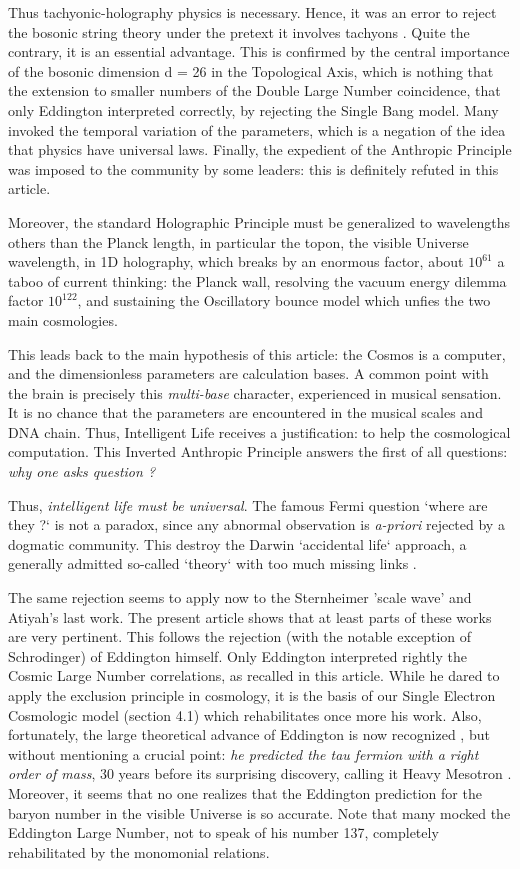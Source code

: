 \documentclass[twoside,draft]{article}
\begin{document}
\begin{sloppypar}
Thus tachyonic-holography physics is necessary. Hence, it was an error to reject the bosonic string theory under the pretext it involves tachyons \cite{Woigt}. Quite the contrary, it is an essential advantage. This is confirmed by the central importance of the bosonic dimension d = 26 in the Topological Axis, which is nothing that the extension to smaller numbers of the Double Large Number coincidence, that only Eddington interpreted correctly, by rejecting the Single Bang model. Many invoked the temporal variation of the parameters, which is a negation of the idea that physics have universal laws. Finally, the expedient of the Anthropic Principle was imposed to the community by some leaders: this is definitely refuted in this article.

Moreover, the standard Holographic Principle must be generalized to wavelengths others than the Planck
length, in particular the topon, the visible Universe wavelength, in 1D holography, which breaks by an enormous factor, about $10^{61}$ a taboo of current thinking: the Planck wall, resolving the vacuum energy dilemma factor $10^{122}$, and sustaining the Oscillatory bounce model which unfies the two main cosmologies.

This leads back to the main hypothesis of this article: the Cosmos is a computer, and the dimensionless parameters are calculation bases. A common point with the brain is precisely this \textit{multi-base} character, experienced in musical sensation. It is no chance that the parameters are encountered in the musical scales and DNA chain. Thus, Intelligent Life receives a justification: to help the cosmological computation. This Inverted Anthropic Principle answers the first of all questions: \textit{why one asks question ?} 

Thus, \textit{intelligent life must be universal}. The famous Fermi question `where are they ?` is not a paradox, since any abnormal observation is \textit{a-priori} rejected by a dogmatic community. This destroy the Darwin `accidental life` approach, a generally admitted so-called `theory` with too much missing links \cite{Chauvin}.

The same rejection seems to apply now to the Sternheimer 'scale wave' and Atiyah's last work. The present article shows that at least parts of these works are very pertinent. This follows the rejection (with the notable exception of Schrodinger) of Eddington\cite{Eddington} himself. Only Eddington interpreted rightly the Cosmic Large Number correlations, as recalled in this article. While he dared to apply the exclusion principle in cosmology, it is the basis of our Single Electron Cosmologic model (section 4.1) which rehabilitates once more his work. Also, fortunately, the large theoretical advance of Eddington is now recognized \cite{Durham}, but without mentioning a crucial point: \textit{he predicted the tau fermion with a right order of mass}, 30 years before its surprising discovery, calling it Heavy Mesotron \cite{Eddington}. Moreover, it seems that no one realizes that the Eddington prediction for the baryon number in the visible Universe is so accurate. Note that many mocked the Eddington Large Number, not to speak of his number 137, completely rehabilitated by the monomonial relations.


\end{sloppypar}
\end{document}
